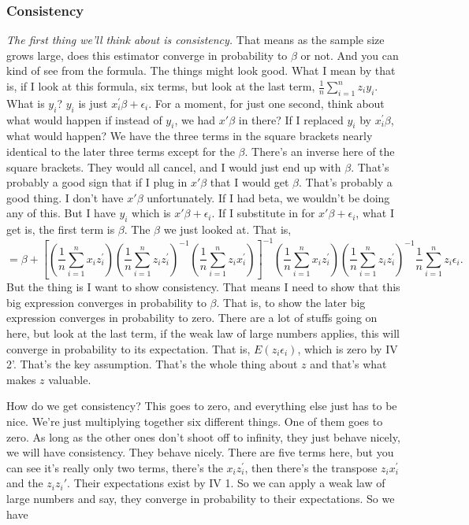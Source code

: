 \documentclass[11pt,a4paper]{amsart}
\theoremstyle{plain}
\theoremstyle{definition}
\begin{document}
 	\subsubsection{Consistency}
 		\emph{The first thing we'll think about is consistency.} That means as the sample size grows large, does this estimator converge in probability to $\beta$ or not. And you can kind of see from the formula. The things might look good. What I mean by that is, if I look at this formula, six terms, but look at the last term, $\frac{1}{n}\sum_{i=1}^{n}z_{i}y_{i}$. What is $y_{i}$? $y_{i}$ is just $x^{'}_{i} \beta + \epsilon_{i}$. For a moment, for just one second, think about what would happen if instead of $y_{i}$, we had $x' \beta$ in there? If I replaced $y_{i}$ by $x^{'}_{i} \beta$, what would happen? We have the three terms in the square brackets nearly identical to the later three terms except for the $\beta$. There's an inverse here of the square brackets. They would all cancel, and I would just end up with $\beta$. That's probably a good sign that if I plug in $x' \beta$ that I would get $\beta$. That's probably a good thing. I don't have $x' \beta$ unfortunately. If I had beta, we wouldn't be doing any of this.  But I have $y_{i}$ which is $x' \beta + \epsilon_{i}$. If I substitute in for $x' \beta + \epsilon_{i}$, what I get is, the first term is $\beta$. The $\beta$ we just looked at. That is, 
 		\[	=	\beta + \left[(\frac{1}{n}\sum_{i=1}^{n}x_{i}z^{'}_{i})(\frac{1}{n}\sum_{i=1}^{n}z_{i}z^{'}_{i})^{-1}(\frac{1}{n}\sum_{i=1}^{n}z_{i}x^{'}_{i})\right]^{-1} (\frac{1}{n}\sum_{i=1}^{n}x_{i}z^{'}_{i})(\frac{1}{n}\sum_{i=1}^{n}z_{i}z^{'}_{i})^{-1}\frac{1}{n}\sum_{i=1}^{n}z_{i}\epsilon_{i}.	\]
 		But the thing is I want to show consistency. That means I need to show that this big expression converges in probability to $\beta$. That is, to show the later big expression converges in probability to zero. There are a lot of stuffs going on here, but look at the last term, if the weak law of large numbers applies, this will converge in probability to its expectation. That is, $E(z_{i}\epsilon_{i})$, which is zero by IV 2'. That's the key assumption. That's the whole thing about $z$ and that's what makes $z$ valuable.\par 
 		How do we get consistency? This goes to zero, and everything else just has to be nice. We're just multiplying together six different things. One of them goes to zero. As long as the other ones don't shoot off to infinity, they just behave nicely, we will have consistency. They behave nicely. There are five terms here, but you can see it's really only two terms, there's the $x_{i}z^{'}_{i}$, then there's the transpose $z_{i}x^{'}_{i}$ and the $z_{i}z_{i}'$. Their expectations exist by IV 1. So we can apply a weak law of large numbers and say, they converge in probability to their expectations. So we have 
\end{document}
